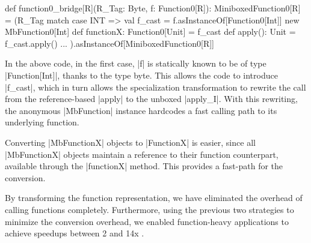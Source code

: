 \begin{lstlisting-nobreak}
 def function0_bridge[R](R_Tag: Byte, f: Function0[R]): MiniboxedFunction0[R] =
   (R_Tag match {
     case INT =>
       val f_cast = f.asInstanceOf[Function0[Int]]
       new MbFunction0[Int] {
         def functionX: Function0[Unit] = f_cast
         def apply(): Unit = f_cast.apply()
       }
     ...
   }).asInstanceOf[MiniboxedFunction0[R]]
\end{lstlisting-nobreak}

In the above code, in the first case, |f| is statically known to be of type |Function[Int]|, thanks to the type byte. This allows the code to introduce |f_cast|, which in turn allows the specialization transformation to rewrite the call from the reference-based |apply| to the unboxed |apply_I|. With this rewriting, the anonymous |MbFunction| instance hardcodes a fast calling path to its underlying function.

Converting |MbFunctionX| objects to |FunctionX| is easier, since all |MbFunctionX| objects maintain a reference to their function counterpart, available through the |functionX| method. This provides a fast-path for the conversion.

By transforming the function representation, we have eliminated the overhead of calling functions completely. Furthermore, using the previous two strategies to minimize the conversion overhead, we enabled function-heavy applications to achieve speedups between 2 and 14x  \cite{ildl-tech, ildl-plugin-wiki}.
